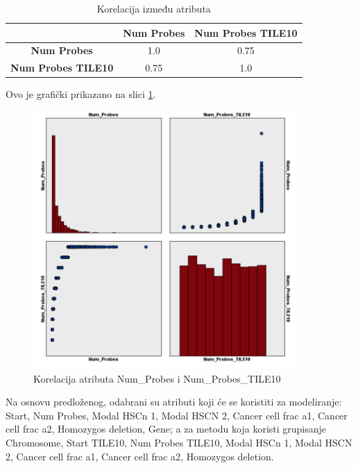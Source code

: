 \documentclass[a4paper]{article}
\begin{document}
\begin{table}[ht!]
\begin{center}
\caption{Korelacija između atributa}
\label{tab:korelacije7}
\begin{tabular}{c|c|c} \hline
& \textbf{Num Probes} & \textbf{Num Probes TILE10}\\ \hline
\textbf{Num Probes} & 1.0 & 0.75\\ \hline
\textbf{Num Probes TILE10} & 0.75 & 1.0\\ \hline
\end{tabular}
\end{center}
\end{table}

Ovo je grafički prikazano na slici \ref{fig:korel_num}.
\begin{figure}[ht!]
                \centering
                \includegraphics[width=0.9\textwidth]{korel_num.PNG}
                \caption{Korelacija atributa Num\_Probes i Num\_Probes\_TILE10}
                \label{fig:korel_num}
            \end{figure}

Na osnovu predloženog, odabrani su atributi koji će se koristiti za modeliranje: Start, Num Probes, Modal HSCn 1, Modal HSCN 2, Cancer cell frac a1, Cancer cell frac a2, Homozygos deletion, Gene; a za metodu koja koristi grupisanje Chromosome, Start TILE10, Num Probes TILE10, Modal HSCn 1, Modal HSCN 2, Cancer cell frac a1, Cancer cell frac a2, Homozygos deletion.
\end{document}
